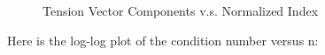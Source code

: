 \documentclass[12pt]{article}
\begin{document}
\begin{figure}[H]

\centering
{}
\hfill
{}

\caption{Tension Vector Components v.s. Normalized Index}
\label{fig:question 2a}
\end{figure}

Here is the log-log plot of the condition number versus n:
\end{document}
